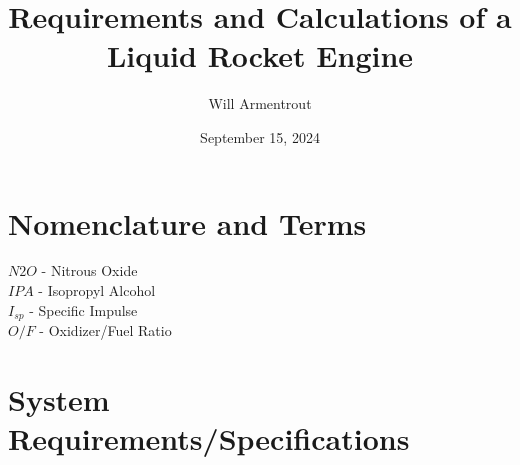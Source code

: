 \documentclass[12pt, letter paper]{article}
\title{Requirements and Calculations of a Liquid Rocket Engine}
\author{Will Armentrout}
\date{September 15, 2024}
\begin{document}
	\maketitle

	\tableofcontents
	
	\section{Nomenclature and Terms}
		$ N2O $ - Nitrous Oxide \\
		$ IPA $ - Isopropyl Alcohol \\
		$I_{sp}$ - Specific Impulse\\
		$ O/F $ - Oxidizer/Fuel Ratio
		
	\section{System Requirements/Specifications}
\end{document}
